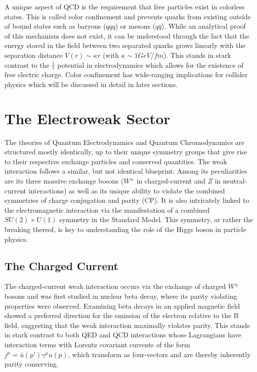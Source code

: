 A unique aspect of QCD is the requirement that free particles exist in colorless states. This is called color confinement 
and prevents quarks from existing outside of bound states such as baryons ($qqq$) or mesons ($q\bar{q}$). While an 
analytical proof of this mechanism does not exist, it can be understood through the fact that the energy stored in the 
field between two separated quarks grows linearly with the separation distance $V(r) \sim \kappa r$ (with 
$\kappa \sim 1 GeV/fm$). This stands in stark contrast to the $\frac{1}{r}$ potential in electrodynamics which allows 
for the existence of free electric charge. Color confinement has wide-ranging implications for collider physics which 
will be discussed in detail in later sections.

\section{The Electroweak Sector}

The theories of Quantum Electrodynamics and Quantum Chromodynamics are structured mostly identically, up to their 
unique symmetry groups that give rise to their respective exchange particles and conserved quantities. The weak 
interaction follows a similar, but not identical blueprint. Among its peculiarities are its three massive exchange bosons 
($W^{\pm}$ in charged-current and $Z$ in neutral-current interactions) as well as its unique ability to violate the 
combined symmetries of charge conjugation and parity (CP). It is also intricately linked to the electromagnetic 
interaction via the manifestation of a combined $SU(2) \times U(1)$ symmetry in the Standard Model. This symmetry, 
or rather the breaking thereof, is key to understanding the role of the Higgs boson in particle physics. 

\subsection{The Charged Current}

The charged-current weak interaction occurs via the exchange of charged $W^{\pm}$ bosons and was first 
studied in nuclear beta decay, where its parity violating properties were observed. Examining beta decays in an 
applied magnetic field showed a preferred direction for the emission of the electron relative to the B field, 
suggesting that the weak interaction maximally violates parity. This stands in stark contrast to both QED and QCD 
interactions whose Lagrangians have interaction terms with Lorentz covariant currents of the form
$j^{\mu} = \bar{u}(p')\gamma^{\mu}u(p)$, which transform as four-vectors and are thereby inherently parity 
conserving. \par

